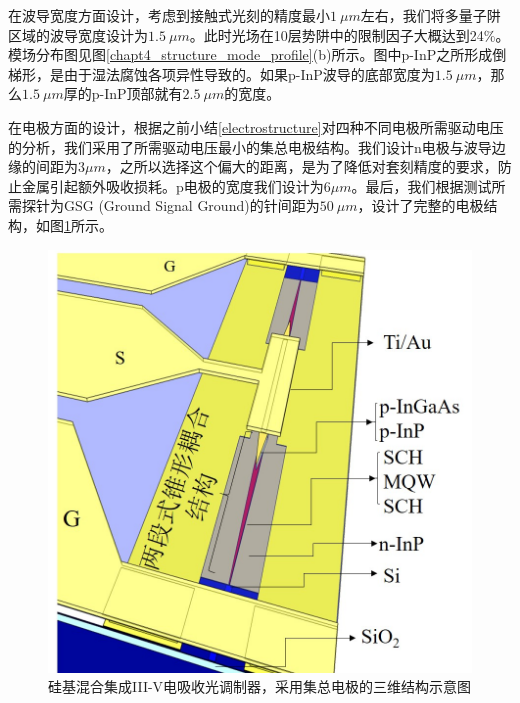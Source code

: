 在波导宽度方面设计，考虑到接触式光刻的精度最小$1~\mu m$左右，我们将多量子阱区域的波导宽度设计为$1.5~\mu m$。此时光场在10层势阱中的限制因子大概达到24\%。模场分布图见图\ref{chapt4_structure_mode_profile}(b)所示。图中p-InP之所形成倒梯形，是由于湿法腐蚀各项异性导致的。如果p-InP波导的底部宽度为$1.5~\mu m$，那么$1.5~\mu m$厚的p-InP顶部就有$2.5~\mu m$的宽度。

在电极方面的设计，根据之前小结\ref{electrostructure}对四种不同电极所需驱动电压的分析，我们采用了所需驱动电压最小的集总电极结构。我们设计n电极与波导边缘的间距为$3\mu m$，之所以选择这个偏大的距离，是为了降低对套刻精度的要求，防止金属引起额外吸收损耗。p电极的宽度我们设计为$6 \mu m$。最后，我们根据测试所需探针为GSG (Ground Signal Ground)的针间距为$50~\mu m$，设计了完整的电极结构，如图\ref{chapt4_3D_structure}所示。

\begin{figure}[htb]
	\centering
	\includegraphics[width=14cm]{./Pictures/chapt4_3D_structure.jpg}
	\caption{ 硅基混合集成III-V电吸收光调制器，采用集总电极的三维结构示意图}
	\label{chapt4_3D_structure}
\end{figure}

